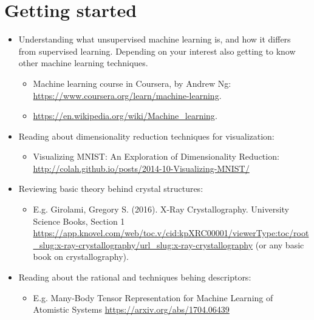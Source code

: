 \documentclass[12pt,a4paper,oneside]{article}	%
\newcommand{\+}[1]{\ensuremath{\mathbf{#1}}}		%
\begin{document}
\section*{Getting started}

\begin{itemize}
  \item Understanding what unsupervised machine learning is, and how it differs from supervised learning. Depending on your interest also getting to know other machine learning techniques.
    \begin{itemize}
      \item Machine learning course in Coursera, by Andrew Ng: \url{https://www.coursera.org/learn/machine-learning}.
      \item \url{https://en.wikipedia.org/wiki/Machine_learning}.
    \end{itemize}
  \item Reading about dimensionality reduction techniques for visualization:
  \begin{itemize}
    \item Visualizing MNIST: An Exploration of Dimensionality Reduction: \url{http://colah.github.io/posts/2014-10-Visualizing-MNIST/}
  \end{itemize}
  \item Reviewing basic theory behind crystal structures:
    \begin{itemize}
      \item E.g. Girolami, Gregory S. (2016). X-Ray Crystallography. University Science Books, Section 1 \url{https://app.knovel.com/web/toc.v/cid:kpXRC00001/viewerType:toc/root_slug:x-ray-crystallography/url_slug:x-ray-crystallography}  (or any basic book on crystallography).
    \end{itemize}
  \item Reading about the rational and techniques behing descriptors:
    \begin{itemize}
      \item E.g. Many-Body Tensor Representation for Machine Learning of Atomistic Systems \url{https://arxiv.org/abs/1704.06439}
    \end{itemize}
\end{itemize}

\renewcommand*{\bibfont}{\scriptsize}
\printbibliography
\end{document}
